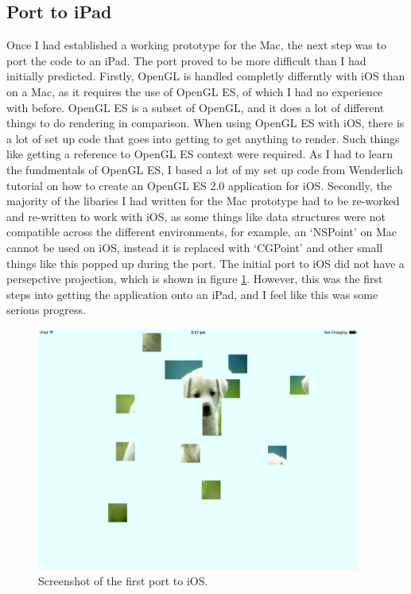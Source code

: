 \documentclass{article}
\begin{document}
\subsection{Port to iPad}
Once I had established a working prototype for the Mac, the next step was to
port the code to an iPad. The port proved to be more difficult than I had
initially predicted. Firstly, OpenGL is handled completly differntly with iOS
than on a Mac, as it requires the use of OpenGL ES, of which I had no experience
with before. OpenGL ES is a subset of OpenGL, and it does a lot of different
things to do rendering in comparison. When using OpenGL ES with iOS, there is a
lot of set up code that goes into getting to get anything to render. Such things
like getting a reference to OpenGL ES context were required. As I had to learn
the fundmentals of OpenGL ES, I based a lot of my set up code from Wenderlich
tutorial \cite{ref:RayOpenGL} on how to create an OpenGL ES 2.0 application for
iOS. Secondly, the majority of the libaries I had written for the Mac prototype
had to be re-worked and re-written to work with iOS, as some things like data
structures were not compatible across the different environments, for example,
an `NSPoint' on Mac cannot be used on iOS, instead it is replaced with `CGPoint'
and other small things like this popped up during the port. The initial port to
iOS did not have a persepctive projection, which is shown in figure
\ref{fig:iPadPort}. However, this was the first steps into getting the
application onto an iPad, and I feel like this was some serious progress.

\begin{figure}[ht]
\begin{center}
\includegraphics[width=0.95\textwidth]{images/iPadPortImage}
\caption{Screenshot of the first port to iOS.}
\label{fig:iPadPort}
\end{center}
\end{figure}
\end{document}
